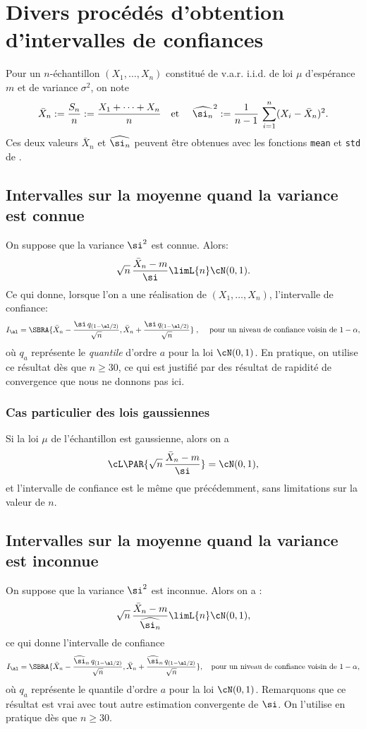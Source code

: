 %
\section{Divers procédés d'obtention d'intervalles de confiances}
%

Pour un $n$-échantillon $(X_1,\ldots,X_n)$ constitué de v.a.r. i.i.d. de loi
$\mu$ d'espérance $m$ et de variance $\sigma^2$, on note
$$
\bar{X}_n := \frac{S_n}{n}:=\frac{X_1+\cdots+X_n}{n} 
\text{\quad et \quad}
\widehat{\si_n}^2:=\frac{1}{n-1}\,\sum_{i=1}^n (X_i-\bar{X}_n)^2.
$$
Ces deux valeurs $\bar{X}_n$ et $\widehat{\si_n}$ peuvent être obtenues avec
les fonctions \texttt{mean} et \texttt{std} de \ML.

%
\subsection{Intervalles sur la moyenne quand la variance est connue} 
%

On suppose que la variance $\si^2$ est connue. Alors:
$$
\sqrt{n}\,\frac{\bar{X}_n -m}{\si} \limL{n} \cN(0,1).
$$
Ce qui donne, lorsque l'on a une réalisation de $(X_1,\ldots,X_n)$,
l'intervalle de confiance:
$$
I_\al=\SBRA{\bar{X}_n-\frac{\si \, q_{(1-\al/2)}}{\sqrt{n}},
  \bar{X}_n+\frac{\si \, q_{(1-\al/2)}}{\sqrt{n}}} \;,\;
\text{\quad pour un niveau de confiance voisin de $1-\alpha$},  
$$
où $q_a$ représente le \emph{quantile} d'ordre $a$ pour la loi $\cN(0,1)$.
En pratique, on utilise ce résultat dès que $n \geq 30$, ce qui est justifié
par des résultat de rapidité de convergence que nous ne donnons pas ici.

\subsubsection{Cas particulier des lois gaussiennes}

Si la loi $\mu$ de l'échantillon est gaussienne, alors on a
$$
\cL\PAR{\sqrt{n}\,\frac{\bar{X}_n-m}{\si}} = \cN(0,1),
$$
et l'intervalle de confiance est le même que précédemment, sans limitations
sur la valeur de $n$.


\subsection{Intervalles sur la moyenne quand la variance est inconnue} 

On suppose que la variance $\si^2$ est inconnue. Alors on a :
$$
\sqrt{n}\,\frac{\bar{X}_n-m}{\widehat{\si_n}} \limL{n} \cN(0,1),
$$
ce qui donne l'intervalle de confiance
$$
I_\al=\SBRA{\bar{X}_n-\frac{\widehat{\si}_n\,q_{(1-\al/2)}}{\sqrt{n}},
  \bar{X}_n+\frac{\widehat{\si}_n\,q_{(1-\al/2)}}{\sqrt{n}}},
\text{\quad pour un niveau de confiance voisin de $1-\alpha$},
$$
où $q_a$ représente le quantile d'ordre $a$ pour la loi $\cN(0,1)$.
Remarquons que ce résultat est vrai avec tout autre estimation convergente
de $\si$. On l'utilise en pratique dès que $n \geq 30$.

